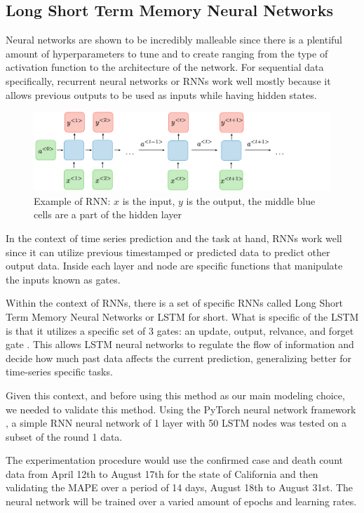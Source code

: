 \documentclass[sigconf,nonacm]{acmart}
\begin{document}
\subsection{Long Short Term Memory Neural Networks}

Neural networks are shown to be incredibly malleable since there is a plentiful
amount of hyperparameters to tune and to create ranging from the type of
activation function to the architecture of the network. For sequential data
specifically, recurrent neural networks or RNNs work well mostly because it
allows previous outputs to be used as inputs while having hidden states. 

\begin{figure}
  \centering
  \includegraphics[width=\linewidth]{figures/architecture-rnn-ltr.png}
  \caption{Example of RNN: $x$ is the input, $y$ is the output, the middle blue
  cells are a part of the hidden layer}
  \label{fig:rnn}
\end{figure}

In the context of time series prediction and the task at hand, RNNs work well
since it can utilize previous timestamped or predicted data to predict other
output data. Inside each layer and node are specific functions that manipulate
the inputs known as gates.

Within the context of RNNs, there is a set of specific RNNs called Long Short
Term Memory Neural Networks or LSTM for short. What is specific of the LSTM is
that it utilizes a specific set of 3 gates: an update, output, relvance, and
forget gate \cite{LSTMlecture}. This allows LSTM neural networks to regulate
the flow of information and decide how much past data affects the current
prediction, generalizing better for time-series specific tasks.

Given this context, and before using this method as our main modeling choice,
we needed to validate this method. Using the PyTorch neural network framework
\cite{Pytorch}, a simple RNN neural network of 1 layer with 50 LSTM nodes was
tested on a subset of the round 1 data. 

The experimentation procedure would use the confirmed case and death count data
from April 12th to August 17th for the state of California and then validating
the MAPE over a period of 14 days, August 18th to August 31st. The neural
network will be trained over a varied amount of epochs and learning rates. 
\end{document}
